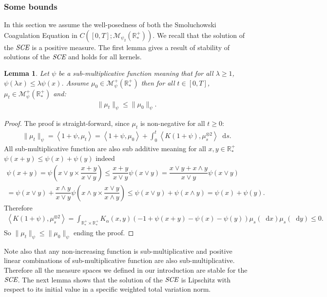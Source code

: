 \documentclass[11pt,a4paper]{article}
\newcommand{\RRP}{\mathbb{R}^+_*}
\newcommand{\MC}{\mathcal{M}}
\newcommand{\SCE}{\emph{SCE}}
\newcommand{\brac}[1]{\left\langle#1\right\rangle}
\newcommand{\dd}{\mathop{}\!\mathrm{d}}
\newtheorem{lemma}[theorem]{Lemma}
\begin{document}
\subsubsection{Some bounds}
In this section we assume the well-posedness of both the Smoluchowski Coagulation Equation in $C([0,T]; \MC_{\psi_2}(\RRP))$. We recall that the solution of the \(\SCE\) is a positive measure. The first lemma gives a result of stability of solutions of the \(\SCE\) and holds for all kernels.
\begin{lemma}\label{lem:sub-add-bounf-smol}
    Let $\psi$ be a sub-multiplicative function meaning that for all $\lambda \geq 1$, $\psi(\lambda x) \leq \lambda \psi(x)$. Assume $\mu_0 \in \MC^+_{\psi}(\RRP)$ then for all $t\in[0,T]$, $\mu_t \in \MC^+_{\psi}(\RRP)$ and:
    \begin{align*}
        \|\mu_t\|_{\psi} \leq \|\mu_0\|_{\psi}.
    \end{align*}
\end{lemma}
\begin{proof}
    The proof is straight-forward, since $\mu_t$ is non-negative for all $t\geq 0$:
    \begin{align*}
        \|\mu_t\|_{\psi} = \brac{1 + \psi,\mu_t} = \brac{1 + \psi,\mu_0} + \int_0^t \brac{K(1 + \psi),\mu_s^{\otimes 2}}\dd s.
    \end{align*}
    All sub-multiplicative function are also sub additive meaning for all $x,y \in \RRP$ \(\psi(x+y) \leq \psi(x) + \psi(y)\) indeed
    \begin{multline*}
        \psi(x+y) = \psi\left(x\vee y \times \dfrac{x+y}{x\vee y} \right) \leq \dfrac{x+y}{x\vee y}\psi\left(x\vee y \right) = \dfrac{x\vee y +x\wedge y}{x\vee y}\psi\left(x\vee y \right) \\
         = \psi\left(x\vee y \right) + \dfrac{x\wedge y}{x\vee y} \psi\left(x\wedge  y \times \dfrac{x\vee  y}{x\wedge  y} \right) \leq \psi\left(x\vee y \right) +  \psi\left(x\wedge  y \right) = \psi\left(x \right) +  \psi\left(y \right).
    \end{multline*}
    Therefore
    \begin{align*}
        \brac{K(1 + \psi),\mu_s^{\otimes 2}} = \int_{\RRP\times \RRP} K_{\alpha}(x,y) \left(-1 + \psi(x+y) - \psi(x) - \psi(y)\right) \mu_s(\dd x) \mu_s (\dd y) \leq 0.
    \end{align*}
    So $ \|\mu_t\|_{\psi} \leq  \|\mu_0\|_{\psi}$ ending the proof.
\end{proof}
Note also that any non-increasing function is sub-multiplicative and positive linear combinations of sub-multiplicative function are also sub-multiplicative. Therefore all the measure spaces we defined in our introduction are stable for the $\SCE$. The next lemma shows that the solution of the $\SCE$ is Lipschitz with respect to its initial value in a specific weighted total variation norm.
\end{document}
